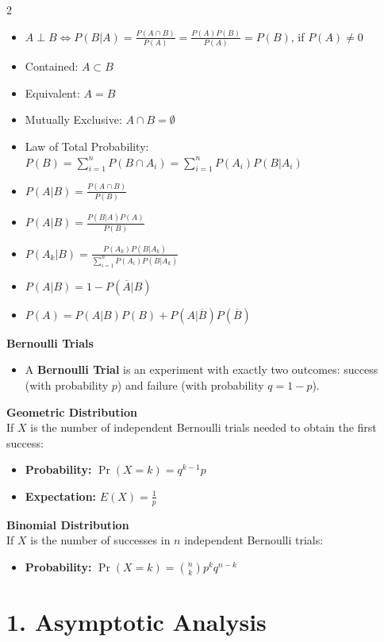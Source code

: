 \documentclass[10pt,landscape]{article}
\begin{document}
\begin{multicols*}{2}
\begin{itemize}
    \item $A \perp B \iff P(B | A) = \frac{P(A \cap B)}{P(A)} = \frac{P(A)P(B)}{P(A)} = P(B)$, if $P(A) \neq 0$
    \item Contained: $A\subset{B}$ 
    \item Equivalent: $A=B$
    \item Mutually Exclusive: $A\cap{B}=\emptyset$ 
    \item Law of Total Probability: $P(B) = \sum^n_{i=1}P(B\cap A_i)=\sum^n_{i=1}P(A_i)P(B|A_i)$ 
    \item $P(A|B)=\frac{P({A}\cap{B})}{P(B)}$ 
    \item $P(A|B) = \frac{P(B|A)P(A)}{P(B)}$
    \item $P(A_k|B)=\frac{P(A_k)P(B|A_k)}{\sum^n_{i=1}P(A_i)P(B|A_k)}$
    \item $P(A|B)=1-P(\overline{A}|B)$ 
    \item $P(A)=P(A|B)P(B)+P(A|\overline{B})P(\overline{B})$ 
\end{itemize}
\vspace{8pt}
\textbf{Bernoulli Trials}
\begin{itemize}
    \item A \textbf{Bernoulli Trial} is an experiment with exactly two outcomes: success (with probability $p$) and failure (with probability $q = 1 - p$).
\end{itemize}
\vspace{8pt}
\textbf{Geometric Distribution} \\
If $X$ is the number of independent Bernoulli trials needed to obtain the first success:
\begin{itemize}
    \item \textbf{Probability:} $\Pr(X = k) = q^{k-1} p$
    \item \textbf{Expectation:} $E(X) = \frac{1}{p}$
\end{itemize}
\vspace{8pt}
\textbf{Binomial Distribution} \\
If $X$ is the number of successes in $n$ independent Bernoulli trials:
\begin{itemize}
    \item \textbf{Probability:} $\Pr(X = k) = \binom{n}{k} p^k q^{n-k}$
\end{itemize}

\hrulefill

\section*{1. Asymptotic Analysis}


\end{multicols*}
\end{document}

